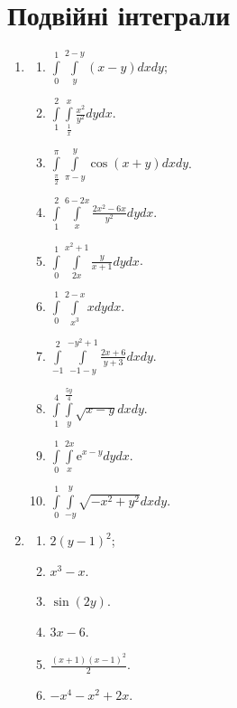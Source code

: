 \section{Подвійні інтеграли}
\begin{enumerate}
    \item
        \begin{multicols}{2}
            \begin{enumerate}[label*=\arabic*.]
                \item ${\int\limits_{0}^{1}\int\limits_{y}^{2-y}\left(x-y\right)d xd y}$;
                \item $\int\limits_{1}^{2} \int\limits_{\frac{1}{x}}^{x}\frac{x^{2}}{y^{2}}d y d x$.
                \item $\int\limits_{\frac{\pi}{2}}^{\pi}\int\limits_{\pi -y}^{y}\cos\! \left(x+y\right)d xd y$.
                \item $\int\limits_{1}^{2} \int\limits_{x}^{6-2 x}\frac{2 x^{2}-6 x}{y^{2}}d y d x$.
                \item ${\int\limits_{0}^{1}\int\limits_{2 x}^{x^{2}+1}\frac{y}{x+1}d yd x}$.
                \item ${\int\limits_{0}^{1}\int\limits_{x^{3}}^{2-x}xd yd x}$.
                \item ${\int\limits_{-1}^{2}\int\limits_{-1-y}^{-y^{2}+1}\frac{2 x+6}{y+3}d x d y}$.
                \item ${\int\limits_{1}^{4}\int\limits_{y}^{\frac{5 y}{4}}\sqrt{x-y}d xd y}$.
                \item ${\int\limits_{0}^{1}\int\limits_{x}^{2 x}{\mathrm e}^{x-y}d yd x}$.
                \item ${\int\limits_{0}^{1}\int\limits_{-y}^{y}\sqrt{-x^{2}+y^{2}}d x d y}$.
            \end{enumerate}
        \end{multicols}
    \item
         \begin{multicols}{2}
            \begin{enumerate}[label*=\arabic*.]
                \item ${2 \left(y-1\right)^{2}}$;
                \item ${x^{3}-x}$.
                \item ${\sin\! \left(2 y\right)}$.
                \item ${3 x-6}$.
                \item ${\frac{\left(x+1\right) \left(x-1\right)^{2}}{2}}$.
                \item ${-x^{4}-x^{2}+2 x}$.

\end{enumerate}
\end{multicols}
\end{enumerate}

